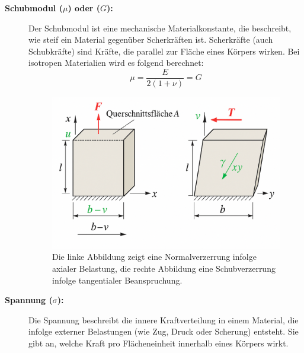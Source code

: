 \begin{description}
	\item[\textbf{Schubmodul ($\mu$) oder ($G$):}] Der Schubmodul ist eine mechanische Materialkonstante, die beschreibt, wie steif ein Material gegenüber Scherkräften ist.
	Scherkräfte (auch Schubkräfte) sind Kräfte, die parallel zur Fläche eines Körpers wirken. 
	Bei isotropen Materialien wird es folgend berechnet:
	\begin{equation}
		\mu = 
		\frac{E}{2(1 + \nu)} =
		G
	\end{equation}
	\begin{figure} [h]
		\centering
		\includegraphics[width=\textwidth]{papers/elastomechanik/images/teil1/Zugverformung_Schubverformung.png}
		\caption{Die linke Abbildung zeigt eine Normalverzerrung infolge axialer Belastung, die rechte Abbildung eine Schubverzerrung infolge tangentialer Beanspruchung.}
		\label{fig:Zugverformung_Schubverformung}
	\end{figure}
	\item[\textbf{Spannung ($\sigma$):}] Die Spannung beschreibt die innere Kraftverteilung in einem Material, die infolge externer Belastungen (wie Zug, Druck oder Scherung) entsteht. 
	Sie gibt an, welche Kraft pro Flächeneinheit innerhalb eines Körpers wirkt.
	

\end{description}
